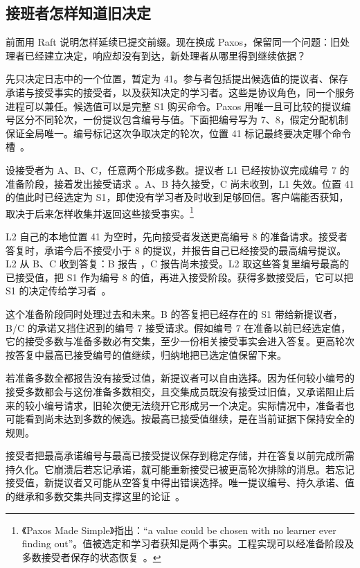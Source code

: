 \subsection*{接班者怎样知道旧决定}

前面用 Raft 说明怎样延续已提交前缀。现在换成 Paxos，保留同一个问题：旧处理者已经建立决定，响应却没有到达，新处理者从哪里得到继续依据？

先只决定日志中的一个位置，暂定为 41。参与者包括提出候选值的提议者、保存承诺与接受事实的接受者，以及获知决定的学习者。这些是协议角色，同一个服务进程可以兼任。候选值可以是完整 S1 购买命令。Paxos 用唯一且可比较的提议编号区分不同轮次，一份提议包含编号与值。下面把编号写为 7、8，假定分配机制保证全局唯一。编号标记这次争取决定的轮次，位置 41 标记最终要决定哪个命令槽~\cite{paxos-made-simple}。

设接受者为 A、B、C，任意两个形成多数。提议者 L1 已经按协议完成编号 7 的准备阶段，接着发出接受请求 。A、B 持久接受，C 尚未收到，L1 失效。位置 41 的值此时已经选定为 S1，即使没有学习者及时收到足够回信。客户端能否获知，取决于后来怎样收集并返回这些接受事实。\footnote{《Paxos Made Simple》指出：“a value could be chosen with no learner ever finding out”。值被选定和学习者获知是两个事实。工程实现可以经准备阶段及多数接受者保存的状态恢复~\cite{paxos-made-simple}。}

L2 自己的本地位置 41 为空时，先向接受者发送更高编号 8 的准备请求。接受者答复时，承诺今后不接受小于 8 的提议，并报告自己已经接受的最高编号提议。L2 从 B、C 收到答复：B 报告 ，C 报告尚未接受。L2 取这些答复里编号最高的已接受值，把 S1 作为编号 8 的值，再进入接受阶段。获得多数接受后，它可以把 S1 的决定传给学习者~\cite{paxos-made-simple}。


这个准备阶段同时处理过去和未来。B 的答复把已经存在的 S1 带给新提议者，B/C 的承诺又挡住迟到的编号 7 接受请求。假如编号 7 在准备以前已经选定值，它的接受多数与准备多数必有交集，至少一份相关接受事实会进入答复。更高轮次按答复中最高已接受编号的值继续，归纳地把已选定值保留下来。

若准备多数全都报告没有接受过值，新提议者可以自由选择。因为任何较小编号的接受多数都会与这份准备多数相交，且交集成员既没有接受过旧值，又承诺阻止后来的较小编号请求，旧轮次便无法绕开它形成另一个决定。实际情况中，准备者也可能看到尚未达到多数的候选。按最高已接受值继续，是在当前证据下保持安全的规则。

接受者把最高承诺编号与最高已接受提议保存到稳定存储，并在答复以前完成所需持久化。它崩溃后若忘记承诺，就可能重新接受已被更高轮次排除的消息。若忘记接受值，新提议者又可能从空答复中得出错误选择。唯一提议编号、持久承诺、值的继承和多数交集共同支撑这里的论证~\cite{paxos-made-simple,part-time-parliament}。

